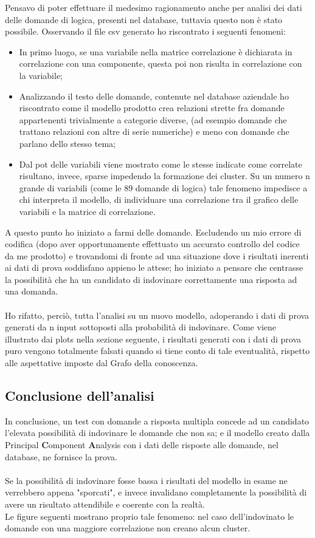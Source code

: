 Pensavo di poter effettuare il medesimo ragionamento anche per analisi dei dati delle domande di logica, presenti nel database, tuttavia questo non \`e stato possibile. Osservando il file csv generato ho riscontrato i seguenti fenomeni:
\begin{itemize}
\item In primo luogo, se una variabile nella matrice correlazione \`e dichiarata in correlazione con una componente, questa poi non risulta in correlazione con la variabile;
\item Analizzando il testo delle domande, contenute nel database aziendale ho riscontrato come il modello prodotto crea relazioni strette fra domande appartenenti trivialmente a categorie diverse, (ad esempio domande che trattano relazioni con altre di serie numeriche) e meno con domande che parlano dello stesso tema;
\item Dal pot delle variabili viene mostrato come le stesse indicate come correlate risultano, invece, sparse impedendo la formazione dei cluster. Su un numero n grande di variabili (come le 89 domande di logica) tale fenomeno  impedisce a chi interpreta il modello, di individuare una correlazione tra il grafico delle variabili e la matrice di correlazione.
\end{itemize}
A questo punto ho iniziato a farmi delle domande. Escludendo un mio errore di codifica (dopo aver opportunamente effettuato un accurato controllo del codice da me prodotto) e trovandomi di fronte ad una situazione dove i risultati inerenti ai dati di prova soddisfano appieno le attese; ho iniziato a pensare che centrasse la possibilit\`a che ha un candidato di indovinare correttamente una risposta ad una domanda.\\\\
Ho rifatto, perci\`o, tutta l'analisi su un nuovo modello, adoperando i dati di prova generati da n input sottoposti alla probabilit\`a di indovinare. Come viene illustrato dai plots nella sezione seguente, i risultati generati con i dati di prova puro vengono totalmente falsati quando si tiene conto di tale eventualit\`a, rispetto alle aspettative imposte dal Grafo della conoscenza. 

\subsection{Conclusione dell'analisi}
\label{Conclusione dell'analisi}
In conclusione, un test con domande a risposta multipla concede ad un candidato l'elevata possibilit\`a di indovinare le domande che non sa; e il modello creato dalla {P}rincipal \textbf{C}omponent \textbf{A}nalysis con i dati delle risposte alle domande, nel database, ne fornisce la prova.\\\\ Se la possibilit\`a di indovinare fosse bassa i risultati del modello in esame ne verrebbero appena "sporcati", e invece invalidano completamente la possibilit\`a di avere un risultato attendibile e coerente con la realt\`a.\\
Le figure seguenti mostrano proprio tale fenomeno: nel caso dell'indovinato le domande con una maggiore correlazione non creano alcun cluster.

